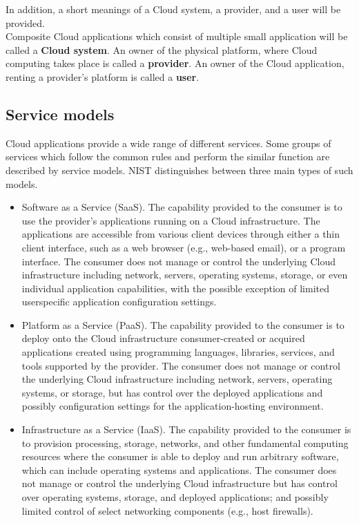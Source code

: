 In addition, a short meanings of a Cloud system, a provider, and a user will be provided.\\
Composite Cloud applications which consist of multiple small application will be called a \textbf{Cloud system}\label{def:csys}. %
An owner of the physical platform, where Cloud computing takes place is called a \textbf{provider}.
An owner of the Cloud application, renting a provider's platform is called a \textbf{user}.
\clearpage
\subsection*{Service models}\label{def:servmod}
Cloud applications provide a wide range of different services.
Some groups of services which follow the common rules and perform the similar function are described by service models.
NIST distinguishes between three main types of such models.
\begin{itemize}
	\item Software as a Service (SaaS). 
	The capability provided to the consumer is to use the provider’s applications running on a Cloud infrastructure. 
	The applications are accessible from various client devices through either a thin client interface, such as a web browser (e.g., web-based email), or a program interface. 
	The consumer does not manage or control the underlying Cloud infrastructure including network, servers, operating systems, storage, or even individual application capabilities, with the possible exception of limited userspecific application configuration settings.~\cite*{nist}
	\item Platform as a Service (PaaS). 
	The capability provided to the consumer is to deploy onto the Cloud infrastructure consumer-created or acquired applications created using programming languages, libraries, services, and tools supported by the provider.
	The consumer does not manage or control the underlying Cloud infrastructure including network, servers, operating systems, or storage, but has control over the deployed applications and possibly configuration settings for the application-hosting environment.~\cite*{nist}
	\item Infrastructure as a Service (IaaS).
	The capability provided to the consumer is to provision processing, storage, networks, and other fundamental computing resources where the
	consumer is able to deploy and run arbitrary software, which can include operating systems and applications.
	The consumer does not manage or control the underlying Cloud infrastructure but has control over operating systems, storage, and deployed applications; and possibly limited control of select networking components (e.g., host firewalls).~\cite*{nist}
\end{itemize}

